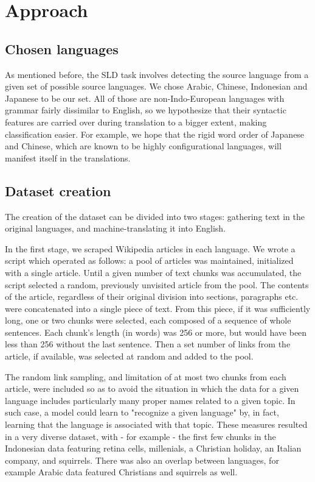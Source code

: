 \documentclass[twocolumn]{article}
\begin{document}
\section*{Approach}

\subsection*{Chosen languages}

As mentioned before, the SLD task involves detecting the source language from a given set of possible source languages. We chose Arabic, Chinese, Indonesian and Japanese to be our set. All of those are non-Indo-European languages with grammar fairly dissimilar to English, so we hypothesize that their syntactic features are carried over during translation to a bigger extent, making classification easier. For example, we hope that the rigid word order of Japanese and Chinese, which are known to be highly configurational languages, will manifest itself in the translations.

\subsection*{Dataset creation}

The creation of the dataset can be divided into two stages: gathering text in the original languages, and machine-translating it into English.

In the first stage, we scraped Wikipedia articles in each language. We wrote a script which operated as follows: a pool of articles was maintained, initialized with a single article. Until a given number of text chunks was accumulated, the script selected a random, previously unvisited article from the pool. The contents of the article, regardless of their original division into sections, paragraphs etc. were concatenated into a single piece of text. From this piece, if it was sufficiently long, one or two chunks were selected, each composed of a sequence of whole sentences. Each chunk's length (in words) was 256 or more, but would have been less than 256 without the last sentence. Then a set number of links from the article, if available, was selected at random and added to the pool.

The random link sampling, and limitation of at most two chunks from each article, were included so as to avoid the situation in which the data for a given language includes particularly many proper names related to a given topic. In such case, a model could learn to "recognize a given language" by, in fact, learning that the language is associated with that topic. These measures resulted in a very diverse dataset, with - for example - the first few chunks in the Indonesian data featuring retina cells, millenials, a Christian holiday, an Italian company, and squirrels. There was also an overlap between languages, for example Arabic data featured Christians and squirrels as well.
\end{document}
